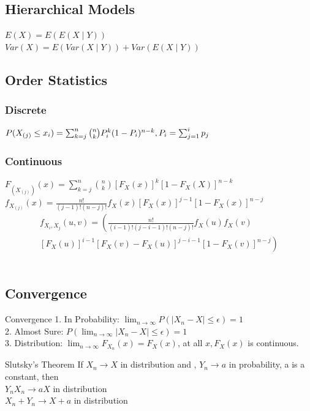 \documentclass{article}
\begin{document}
\begin{multicols*}{3}
\subsection{Hierarchical Models}
$E(X) = E(E(X\mid Y))$\\
$Var(X) = E(Var(X \mid Y)) + Var(E(X \mid Y))$

\subsection{Order Statistics}
\subsubsection{Discrete}
$P(X_{(j)}\le x_i) = \sum^{n}_{k = j}{n \choose k}P_i^k(1-P_i)^{n-k}, \\ P_i = \sum^{i}_{j =1}p_j$ \\

\subsubsection{Continuous}
$ F_{(X_{(j)})}(x) = \sum^{n}_{k = j}{n \choose k} [F_{X}(x)]^k[1-F_{X}(X)]^{n-k}$\\
$f_{X_{(j)}}(x) = \frac{n!}{(j-1)!(n-j)!}f_X(x)[F_X(x)]^{j-1}[1-F_X(x)]^{n-j}$ \\
\begin{equation}
\begin{aligned}
f_{X_{i}, X_{j}}(u,v) = \left( \frac{n!}{(i-1)!(j-i-1)!(n-j)!}f_X(u)f_X(v) \right. \\
\left. [F_X(u)]^{i-1}[F_X(v) - F_X(u)]^{j-i-1}[1-F_X(v)]^{n-j} \right)
\end{aligned}
\end{equation} \\

\subsection{Convergence}

\begin{thmbox}{Convergence}
1. In Probability: $\lim_{n \to \infty} P(\lvert X_n - X\rvert \le \epsilon) = 1$ \\
2. Almost Sure: $P(\lim_{n \to \infty} \lvert X_n - X\rvert \le \epsilon) = 1$ \\
3. Distribution: $\lim_{n \to \infty} F_{X_n}(x) = F_X(x)$, at all $x, F_X(x)$ is continuous.
\end{thmbox}
\begin{thmbox}{Slutsky's Theorem}
If $X_n \rightarrow X$ in distribution and , $Y_n \rightarrow a $ in probability, a is a constant, then \\
$Y_n X_n \rightarrow aX $ in distribution \\
$X_n +Y_n \rightarrow X + a$ in distribution
\end{thmbox}


\end{multicols*}
\end{document}
